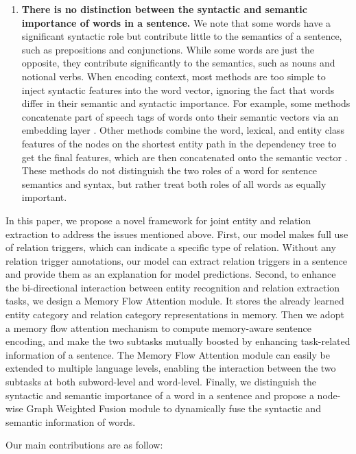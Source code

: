 \documentclass[sigconf]{acmart}
\begin{document}
\begin{enumerate}
    \item \textbf{There is no distinction between the syntactic and semantic importance of words in a sentence.} We note that some words have a significant syntactic role but contribute little to the semantics of a sentence, such as prepositions and conjunctions. While some words are just the opposite, they contribute significantly to the semantics, such as nouns and notional verbs. When encoding context, most methods are too simple to inject syntactic features into the word vector, ignoring the fact that words differ in their semantic and syntactic importance. For example, some methods concatenate part of speech tags of words onto their semantic vectors via an embedding layer \cite{miwa2016end, fu2019graphrel}. Other methods combine the word, lexical, and entity class features of the nodes on the shortest entity path in the dependency tree to get the final features, which are then concatenated onto the semantic vector  \cite{bunescu2005shortest, miwa2016end}. These methods do not distinguish the two roles of a word for sentence semantics and syntax, but rather treat both roles of all words as equally important.
\end{enumerate}

In this paper, we propose a novel framework for joint entity and relation extraction to address the issues mentioned above. First, our model makes full use of relation triggers, which can indicate a specific type of relation. Without any relation trigger annotations, our model can extract relation triggers in a sentence and provide them as an explanation for model predictions. Second, to enhance the bi-directional interaction between entity recognition and relation extraction tasks, we design a Memory Flow Attention module. It stores the already learned entity category and relation category representations in memory. Then we adopt a memory flow attention mechanism to compute memory-aware sentence encoding, and make the two subtasks mutually boosted by enhancing task-related information of a sentence.
The Memory Flow Attention module can easily be extended to multiple language levels, enabling the interaction between the two subtasks at both subword-level and word-level. Finally, we distinguish the syntactic and semantic importance of a word in a sentence and propose a node-wise Graph Weighted Fusion module to dynamically fuse the syntactic and semantic information of words.

Our main contributions are as follow:
\end{document}
